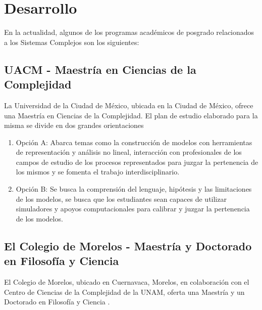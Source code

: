 \section{Desarrollo}
	En la actualidad, algunos de los programas académicos de posgrado relacionados a los Sistemas Complejos son los siguientes:
\subsection{UACM - Maestría en Ciencias de la Complejidad}
	La Universidad de la Ciudad de México, ubicada en la Ciudad de México, ofrece una Maestría en Ciencias de la Complejidad\cite{UACM}. El plan de estudio elaborado para la misma se divide en dos grandes orientaciones
	\begin{enumerate}
		\item Opción A: Abarca temas como la construcción de modelos con herramientas de representación y análisis no lineal, interacción con profesionales de los campos de estudio de los procesos representados para juzgar la pertenencia de los mismos y se fomenta el trabajo interdisciplinario.
		\item Opción B: Se busca la comprensión del lenguaje, hipótesis y las limitaciones de los modelos, se busca que los estudiantes sean capaces de utilizar simuladores y apoyos computacionales para calibrar y juzgar la pertenencia de los modelos.
	\end{enumerate}

\subsection{El Colegio de Morelos - Maestría y Doctorado en Filosofía y Ciencia}
	El Colegio de Morelos, ubicado en Cuernavaca, Morelos, en colaboración con el Centro de Ciencias de la Complejidad de la UNAM, oferta una Maestría y un Doctorado  en Filosofía y Ciencia \cite{MORELOS}.
	


